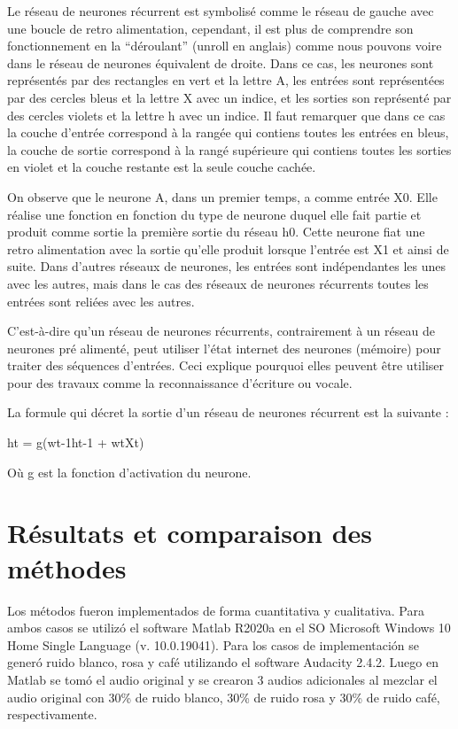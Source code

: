 \documentclass[conference,onecolumn]{IEEEtran}
\begin{document}

Le réseau de neurones récurrent est symbolisé comme le réseau de gauche avec une boucle de retro alimentation, cependant, il est plus de comprendre son fonctionnement en la “déroulant” (unroll en anglais) comme nous pouvons voire dans le réseau de neurones équivalent de droite. Dans ce cas, les neurones sont représentés par des rectangles en vert et la lettre A, les entrées sont représentées par des cercles bleus et la lettre X avec un indice, et les sorties son représenté par des cercles violets et la lettre h avec un indice. Il faut remarquer que dans ce cas la couche d’entrée correspond à la rangée qui contiens toutes les entrées en bleus, la couche de sortie correspond à la rangé supérieure qui contiens toutes les sorties en violet et la couche restante est la seule couche cachée. 

On observe que le neurone A, dans un premier temps, a comme entrée X0. Elle réalise une fonction en fonction du type de neurone duquel elle fait partie et produit comme sortie la première sortie du réseau h0.  Cette neurone fiat une retro alimentation avec la sortie qu’elle produit lorsque l’entrée est X1 et ainsi de suite. Dans d’autres réseaux de neurones, les entrées sont indépendantes les unes avec les autres, mais dans le cas des réseaux de neurones récurrents toutes les entrées sont reliées avec les autres. 

C’est-à-dire qu'un réseau de neurones récurrents, contrairement à un réseau de neurones pré alimenté, peut utiliser l’état internet des neurones (mémoire) pour traiter des séquences d’entrées. Ceci explique pourquoi elles peuvent être utiliser pour des travaux comme la reconnaissance d’écriture ou vocale. 

La formule qui décret la sortie d’un réseau de neurones récurrent est la suivante : 

 

ht = g(wt-1ht-1 + wtXt) 

Où g est la fonction d’activation du neurone.  


\clearpage %
\section{Résultats et comparaison des méthodes}
Los métodos fueron implementados de forma cuantitativa y cualitativa. Para ambos casos se utilizó el software Matlab R2020a en el SO Microsoft Windows 10 Home Single Language (v. 10.0.19041). Para los casos de implementación se generó ruido blanco, rosa y café utilizando el software Audacity 2.4.2. Luego en Matlab se tomó el audio original y se crearon 3 audios adicionales al mezclar el audio original con 30\% de ruido blanco, 30\% de ruido rosa y 30\% de ruido café, respectivamente.
\end{document}
